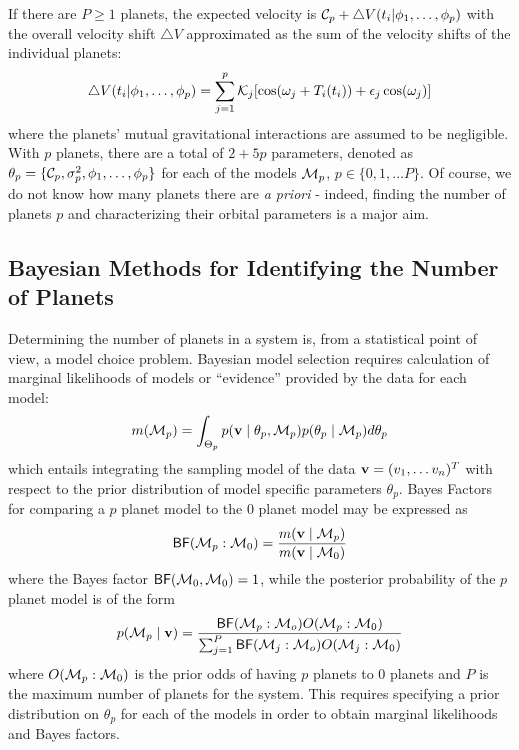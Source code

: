 If there are $P \ge 1$ planets, the expected velocity is ${\cal{C}}_p
+ \bigtriangleup V(t_i|\phi_1,\ldots,\phi_p)$ with the overall velocity shift
$\bigtriangleup V$  approximated as the sum of the velocity
shifts of the individual planets:
\begin{equation}\label{Velocity_2p_Model}
\bigtriangleup V(t_i|\phi_1,\ldots,\phi_p)=\sum_{j=1}^p
\K_j[\cos(\omega_j+T_i(t_i))+\e_j\cos(\omega_j)]
\end{equation}
where the planets' mutual gravitational interactions are assumed to be
negligible.  With $p$ planets, there are a total of $2+5p$ parameters,
denoted as 
$\theta_p = \{ \mathcal{C}_p,\sigma_p^2,\phi_1,\ldots,\phi_p\}$ for each of
the models ${\cal{M}}_p$, $p \in \{0, 1, \ldots P\}$. Of course, we do not
know how many planets there are \emph{a priori} - indeed, finding the
number of planets $p$ and characterizing their orbital parameters is
a major aim.

\subsection{Bayesian Methods for Identifying the Number of Planets}
Determining the number of planets in a
system is, from a statistical point of view, a model choice
problem. Bayesian model selection requires calculation of marginal
likelihoods of models or ``evidence'' provided by the data for each model:
\begin{equation}\label{marginal_lik}
m( \M_p) = \int_{\Theta_p}
p(\v \mid \theta_p,\M_p) p(\theta_p \mid \M_p) d\theta_p
\end{equation} 
which entails integrating the sampling model of the
data $\mathbf{v} = (v_1, \ldots v_n)^T$ with respect to the prior distribution
of model specific parameters $\theta_p$.
Bayes Factors for comparing a $p$ planet model to the $0$ planet model
may be expressed  as
\begin{equation}
\BF(\M_p:\M_0)=\frac{m( \v \mid \M_p)}{m(\v \mid \M_0)}
\end{equation}
where the Bayes factor $\textsf{BF}({\cal{M}}_0,{\cal{M}}_0) = 1$,
while the posterior probability of the $p$ planet model is of the
form
\begin{equation}
  \label{eq:post-prob}
  p(\M_p \mid \v) = \frac{\BF(\M_p:\M_o) O(\M_p: \M_0)} 
{ \sum_{ j= 1}^{P} \BF(\M_j:\M_o) O(\M_j: \M_0)}
\end{equation}
where $O({\cal{M}}_p: {\cal{M}}_0)$ is the prior odds of having $p$ planets to $0$
planets and $P$ is the maximum number of planets for the
system.  This requires specifying a prior distribution on $\theta_p$
for each of the models in order to obtain marginal likelihoods and
Bayes factors.

